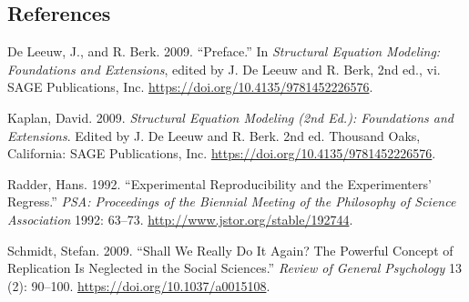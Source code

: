 \documentclass[
  12pt,
  letterpaper,
  man]{apa7}
\newlength{\cslhangindent}
\newenvironment{CSLReferences}[2] %
 {\begin{list}{}{%
  \setlength{\itemindent}{0pt}
  \setlength{\leftmargin}{0pt}
  \setlength{\parsep}{0pt}
  \ifodd #1
   \setlength{\leftmargin}{\cslhangindent}
   \setlength{\itemindent}{-1\cslhangindent}
  \fi
  \setlength{\itemsep}{#2\baselineskip}}}
 {\end{list}}
\begin{document}
\subsection*{References}\label{references}

\label{refs}
\begin{CSLReferences}{1}{0}
De Leeuw, J., and R. Berk. 2009. {``{Preface}.''} In \emph{Structural
Equation Modeling: Foundations and Extensions}, edited by J. De Leeuw
and R. Berk, 2nd ed., vi. SAGE Publications, Inc.
\url{https://doi.org/10.4135/9781452226576}.

Kaplan, David. 2009. \emph{Structural {Equation} {Modeling} (2nd Ed.):
{Foundations} and {Extensions}}. Edited by J. De Leeuw and R. Berk. 2nd
ed. Thousand Oaks, California: SAGE Publications, Inc.
\url{https://doi.org/10.4135/9781452226576}.

Radder, Hans. 1992. {``Experimental Reproducibility and the
Experimenters' Regress.''} \emph{PSA: Proceedings of the Biennial
Meeting of the Philosophy of Science Association} 1992: 63--73.
\url{http://www.jstor.org/stable/192744}.

Schmidt, Stefan. 2009. {``Shall We {Really} Do It {Again}? {The}
{Powerful} {Concept} of {Replication} Is {Neglected} in the {Social}
{Sciences}.''} \emph{Review of General Psychology} 13 (2): 90--100.
\url{https://doi.org/10.1037/a0015108}.

\end{CSLReferences}
\end{document}
